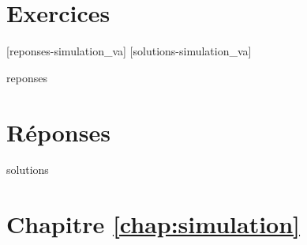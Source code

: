 \section{Exercices}
\label{sec:simulation:exercices}


[reponses-simulation_va]
[solutions-simulation_va]

\begin{Filesave}{reponses}
\bigskip
\section*{Réponses}

\end{Filesave}

\begin{Filesave}{solutions}
\section*{Chapitre \ref{chap:simulation}}

\end{Filesave}


